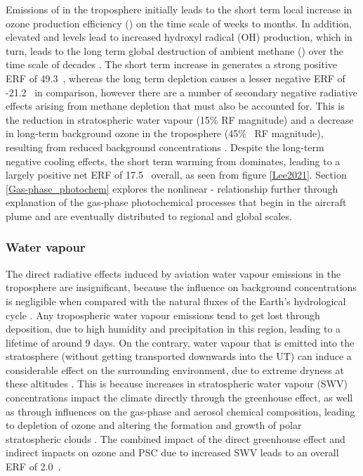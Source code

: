 Emissions of  in the troposphere initially leads to the short term local increase in ozone production efficiency () on the time scale of weeks to months. In addition, elevated  and  levels lead to increased hydroxyl radical (OH) production, which in turn, leads to the long term global destruction of ambient methane () over the time scale of decades \cite{Stevenson2004, Wild2001, Myhre2011}. The short term increase in  generates a strong positive ERF of 49.3~, whereas the long term  depletion causes a lesser negative ERF of -21.2~ in comparison, however there are a number of secondary negative radiative effects arising from methane depletion that must also be accounted for. This is the reduction in stratospheric water vapour (15\%  RF magnitude) and a decrease in long-term background ozone in the troposphere (45\%~ RF magnitude), resulting from reduced background  concentrations \cite{Holmes2011, Myhre2007}. Despite the long-term negative cooling effects, the short term warming from  dominates, leading to a largely positive net ERF of 17.5~ overall, as seen from figure \ref{Lee2021}. Section \ref{Gas-phase_photochem} explores the nonlinear - relationship further through explanation of the gas-phase photochemical processes that begin in the aircraft plume and are eventually distributed to regional and global scales. 

\subsubsection{Water vapour}
The direct radiative effects induced by aviation water vapour emissions in the troposphere are insignificant, because the influence on background concentrations is negligible when compared with the natural fluxes of the Earth's hydrological cycle \cite{IPCC1999}. Any tropospheric water vapour emissions tend to get lost through deposition, due to high humidity and precipitation in this region, leading to a lifetime of around 9 days. On the contrary, water vapour that is emitted into the stratosphere (without getting transported downwards into the UT) can induce a considerable effect on the surrounding environment, due to extreme dryness at these altitudes \cite{Jensen1996}. This is because increases in stratospheric water vapour (SWV) concentrations impact the climate directly through the greenhouse effect, as well as through influences on the gas-phase and aerosol chemical composition, leading to depletion of ozone and altering the formation and growth of polar stratospheric clouds \cite{Stenke2005}. The combined impact of the direct greenhouse effect and indirect impacts on ozone and PSC due to increased SWV leads to an overall ERF of 2.0~.

